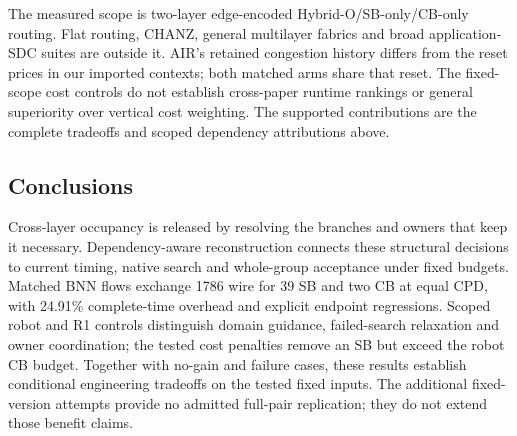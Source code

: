 \documentclass[conference,10pt]{IEEEtran}
\begin{document}
The measured scope is two-layer edge-encoded Hybrid-O/SB-only/CB-only routing. Flat routing, CHANZ, general multilayer fabrics and broad application-SDC suites are outside it. AIR's retained congestion history differs from the reset prices in our imported contexts; both matched arms share that reset. The fixed-scope cost controls do not establish cross-paper runtime rankings or general superiority over vertical cost weighting. The supported contributions are the complete tradeoffs and scoped dependency attributions above.

\subsection{Conclusions}
Cross-layer occupancy is released by resolving the branches and owners that keep it necessary. Dependency-aware reconstruction connects these structural decisions to current timing, native search and whole-group acceptance under fixed budgets. Matched BNN flows exchange 1786 wire for 39 SB and two CB at equal CPD, with 24.91\% complete-time overhead and explicit endpoint regressions. Scoped robot and R1 controls distinguish domain guidance, failed-search relaxation and owner coordination; the tested cost penalties remove an SB but exceed the robot CB budget. Together with no-gain and failure cases, these results establish conditional engineering tradeoffs on the tested fixed inputs. The additional fixed-version attempts provide no admitted full-pair replication; they do not extend those benefit claims.


\end{document}
